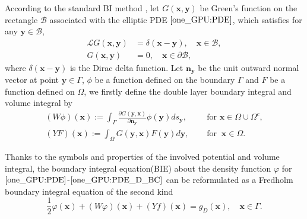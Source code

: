 \documentclass{article}
\begin{document}
According to the standard BI method \cite{aliabadi2011boundary,yu2002natural}, let $G(\mathbf{x}, \mathbf{y})$ be Green's function on the rectangle $\mathcal{B}$ associated with the elliptic PDE $\eqref{one_GPU:PDE}$, which satisfies for any $\mathbf{y} \in \mathcal{B}$,
\begin{align}
\mathcal{L} G(\mathbf{x}, \mathbf{y}) &= \delta(\mathbf{x}-\mathbf{y}), \quad \mathbf{x} \in \mathcal{B}, \\
G(\mathbf{x}, \mathbf{y}) &=0, \quad \mathbf{x} \in \partial \mathcal{B},
\end{align}
where $\delta(\mathbf{x} - \mathbf{y})$ is the Dirac delta function. Let $\mathbf{n}_{\mathbf{y}}$ be the unit outward normal vector at point $\mathbf{y}\in \Gamma$, $\phi$ be a function defined on the boundary $\Gamma$ and $F$ be a function defined on $\Omega$, we firstly define the double layer boundary integral and volume integral by
\begin{align}
(W \phi)(\mathbf{x}) := \int_{\Gamma} \frac{\partial G(\mathbf{y}, \mathbf{x})}{\partial \mathbf{n}_{\mathbf{y}}} \phi(\mathbf{y}) d s_{\mathbf{y}}, \quad & \text { for } \mathbf{x} \in \Omega \cup \Omega^{c},\label{one_GPU:double} \\
(YF)(\mathbf{x}) := \int_{\Omega} G(\mathbf{y}, \mathbf{x})F(\mathbf{y}) d\mathbf{y}, \quad & \text{ for } ~\mathbf{x} \in \Omega.
    \label{one_GPU:volume}
\end{align}


Thanks to the symbols and properties of the involved potential and volume integral, the boundary integral equation(BIE) about the density function $\varphi$ for $\eqref{one_GPU:PDE}$-$\eqref{one_GPU:PDE_D_BC}$ can be reformulated as a Fredholm boundary integral equation of the second kind \cite{kress1989linear,hsiao2008boundary}
\begin{equation}
    \frac{1}{2}\varphi (\mathbf{x}) + (W\varphi)(\mathbf{x}) + (Yf)(\mathbf{x}) = g_{D}(\mathbf{x}), \quad \mathbf{x} \in \Gamma. \label{one_GPU:second_fredholm}
\end{equation}
\end{document}
